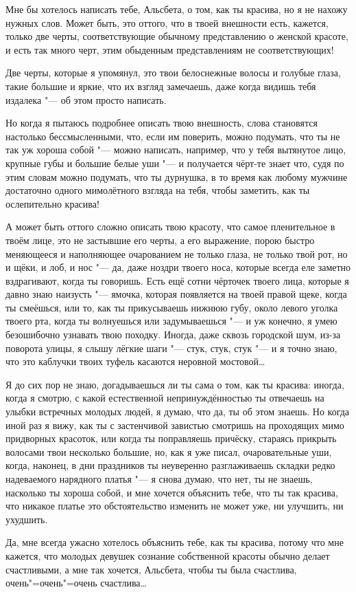 Мне бы хотелось написать тебе, Альсбета, о том, как ты красива, но я не нахожу
нужных слов.
Может быть, это оттого, что в твоей внешности есть, кажется, только две черты,
соответствующие обычному представлению о женской красоте, и есть так много черт,
этим обыденным представлениям не соответствующих!

Две черты, которые я упомянул, это твои белоснежные волосы и голубые глаза,
такие большие и яркие, что их взгляд замечаешь, даже когда видишь тебя издалека
"--- об этом просто написать.

Но когда я пытаюсь подробнее описать твою внешность, слова становятся настолько
бессмысленными, что, если им поверить, можно подумать, что ты не так уж хороша
собой "--- можно написать, например, что у тебя вытянутое лицо, крупные губы и
большие белые уши "--- и получается чёрт-те знает что, судя по этим словам можно
подумать, что ты дурнушка, в то время как любому мужчине достаточно одного
мимолётного взгляда на тебя, чтобы заметить, как ты ослепительно красива!

А может быть оттого сложно описать твою красоту, что самое пленительное в твоём
лице, это не застывшие его черты, а его выражение, порою быстро меняющееся и
наполняющее очарованием не только глаза, не только твой рот, но и щёки, и лоб,
и нос "--- да, даже ноздри твоего носа, которые всегда еле заметно вздрагивают,
когда ты говоришь.
Есть ещё сотни чёрточек твоего лица, которые я давно знаю наизусть "--- ямочка,
которая появляется на твоей правой щеке, когда ты смеёшься, или то, как ты
прикусываешь нижнюю губу, около левого уголка твоего рта, когда ты волнуешься
или задумываешься "--- и уж конечно, я умею безошибочно узнавать твою походку.
Иногда, даже сквозь городской шум, из-за поворота улицы, я слышу лёгкие шаги
"--- стук, стук, стук "--- и я точно знаю, что это каблучки твоих туфель
касаются неровной мостовой\ldots

Я до сих пор не знаю, догадываешься ли ты сама о том, как ты красива: иногда,
когда я смотрю, с какой естественной непринуждённостью ты отвечаешь на улыбки
встречных молодых людей, я думаю, что да, ты об этом знаешь.
Но когда иной раз я вижу, как ты с застенчивой завистью смотришь на проходящих
мимо придворных красоток, или когда ты поправляешь причёску, стараясь прикрыть
волосами твои несколько большие, но, как я уже писал, очаровательные уши, когда,
наконец, в дни праздников ты неуверенно разглаживаешь складки редко надеваемого
нарядного платья "--- я снова думаю, что нет, ты не знаешь, насколько ты хороша
собой, и мне хочется объяснить тебе, что ты так красива, что никакое платье это
обстоятельство изменить не может уже, ни улучшить, ни ухудшить.

Да, мне всегда ужасно хотелось объяснить тебе, как ты красива, потому что мне
кажется, что молодых девушек сознание собственной красоты обычно делает
счастливыми, а мне так хочется, Альсбета, чтобы ты была счастлива,
очень"=очень"=очень счастлива\ldots
